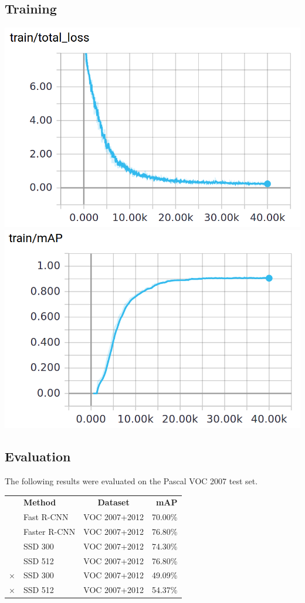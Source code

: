 \documentclass[a0, portrait]{a0poster}
\begin{document}
\begin{multicols}{3}
\subsection*{Training}

\begin{center}\vspace{1cm}
  \includegraphics[width=0.45\linewidth]{train_loss_ssd_300.png}
  \includegraphics[width=0.45\linewidth]{train_mAP_ssd_300.png}
\end{center}

\subsection*{Evaluation}

The following results were evaluated on the Pascal VOC 2007 test set.
\begin{center}\vspace{1cm}
  \begin{tabular}{rl|c|r}
    & \textbf{Method} & \textbf{Dataset} & \textbf{mAP} \\ \cline{2-4}
    & Fast R-CNN & VOC 2007+2012 & 70.00\% \\
    & Faster R-CNN & VOC 2007+2012 & 76.80\% \\ \cline{2-4}
    & SSD 300 & VOC 2007+2012 & 74.30\% \\
    & SSD 512 & VOC 2007+2012 & 76.80\% \\ \cmidrule(r){2-4} \morecmidrules \cmidrule(r){2-4}
    $\times$ & SSD 300 & VOC 2007+2012 & 49.09\% \\
    $\times$ & SSD 512 & VOC 2007+2012 & 54.37\%
  \end{tabular}
\end{center}


\end{multicols}
\end{document}
